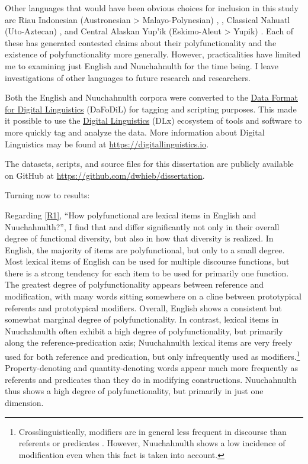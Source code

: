 Other languages that would have been obvious choices for inclusion in this study are Riau Indonesian (Austronesian > Malayo-Polynesian) \parencite{Gil1994},  \parencites{EvansOsada2005}{HengeveldRijkhoff2005}, Classical Nahuatl (Uto-Aztecan) \parencites{Launey1994}{Launey2004}, and Central Alaskan Yup'ik (Eskimo-Aleut > Yupik) \parencites{Thalbitzer1922}{Sadock1999}{Mithun2017}. Each of these has generated contested claims about their polyfunctionality and the existence of polyfunctionality more generally. However, practicalities have limited me to examining just English and Nuuchahnulth for the time being. I leave investigations of other languages to future research and researchers.

Both the English and Nuuchahnulth corpora were converted to the \href{https://format.digitallinguistics.io}{Data Format for Digital Linguistics} (DaFoDiL)  for tagging and scripting purposes. This made it possible to use the \href{https://digitallinguistics.io}{Digital Linguistics} (DLx) ecosystem of tools and software to more quickly tag and analyze the data. More information about Digital Linguistics may be found at \url{https://digitallinguistics.io}.

The datasets, scripts, and source files for this dissertation are publicly available on GitHub at \url{https://github.com/dwhieb/dissertation}.

Turning now to results:

Regarding \ref{R1}, \enquote{How polyfunctional are lexical items in English and Nuuchahnulth?}, I find that  and  differ significantly not only in their overall degree of functional diversity, but also in how that diversity is realized. In English, the majority of items are polyfunctional, but only to a small degree. Most lexical items of English can be used for multiple discourse functions, but there is a strong tendency for each item to be used for primarily one function. The greatest degree of polyfunctionality appears between reference and modification, with many words sitting somewhere on a cline between prototypical referents and prototypical modifiers. Overall, English shows a consistent but somewhat marginal degree of polyfunctionality. In contrast, lexical items in Nuuchahnulth often exhibit a high degree of polyfunctionality, but primarily along the reference-predication axis; Nuuchahnulth lexical items are very freely used for both reference and predication, but only infrequently used as modifiers.\footnote{Crosslinguistically, modifiers are in general less frequent in discourse than referents or predicates \parencite[§3.3.2]{Croft1991}. However, Nuuchahnulth shows a low incidence of modification even when this fact is taken into account.} Property-denoting and quantity-denoting words appear much more frequently as referents and predicates than they do in modifying constructions. Nuuchahnulth thus shows a high degree of polyfunctionality, but primarily in just one dimension.


